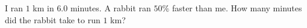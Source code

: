 I ran $1$ km in $6.0$ minutes. A rabbit ran $50\%$ faster than me. How many minutes did the rabbit take to run $1$ km?
